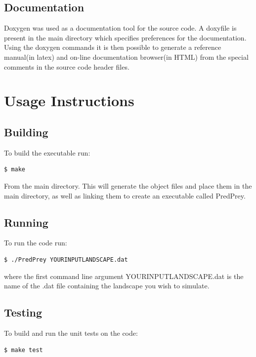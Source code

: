 \subsection{Documentation}
Doxygen was used as a documentation tool for the source code. A doxyfile is present in the main directory which specifies preferences for the documentation. Using the doxygen commands it is then possible to generate a reference manual(in latex) and on-line documentation browser(in HTML) from the special comments in the source code header files. 

\section{Usage Instructions}

\subsection{Building}
To build the executable run:
\begin{lstlisting}[language=bash]
$ make

\end{lstlisting}
From the main directory. This will generate the object files and place them in the main directory, as well as linking them to create an executable called PredPrey.

\subsection{Running}
To run the code run:
\begin{lstlisting}[language=bash]
$ ./PredPrey YOURINPUTLANDSCAPE.dat

\end{lstlisting}
where the first command line argument YOURINPUTLANDSCAPE.dat is the name of the .dat file containing the landscape you wish to simulate. 
\subsection{Testing}
To build and run the unit tests on the code:
\begin{lstlisting}[language=bash]
$ make test
\end{lstlisting}

